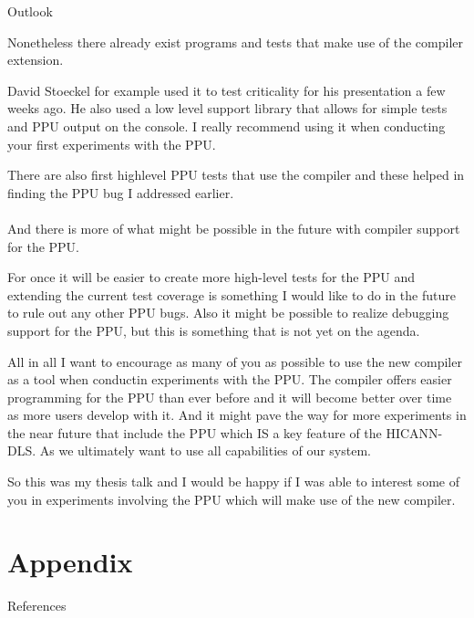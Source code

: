 \documentclass[10pt,aspectratio=169]{beamer}
\begin{document}
\begin{frame}[fragile]{Outlook}
{		Nonetheless there already exist programs and tests that make use of the compiler extension.

		David Stoeckel for example used it to test criticality for his presentation a few weeks ago.
		He also used a low level support library that allows for simple tests and PPU output on the console.
		I really recommend using it when conducting your first experiments with the PPU.

		There are also first highlevel PPU tests that use the compiler and these helped in finding the PPU bug I addressed earlier.
		\\
		\\
		And there is more of what might be possible in the future with compiler support for the PPU.

		For once it will be easier to create more high-level tests for the PPU and extending the current test coverage is something I would like to do in the future to rule out any other PPU bugs.
		Also it might be possible to realize debugging support for the PPU, but this is something that is not yet on the agenda.

		All in all I want to encourage as many of you as possible to use the new compiler as a tool when conductin experiments with the PPU.
		The compiler offers easier programming for the PPU than ever before and it will become better over time as more users develop with it.
		And it might pave the way for more experiments in the near future that include the PPU which IS a key feature of the HICANN-DLS.
		As we ultimately want to use all capabilities of our system.

		So this was my thesis talk and I would be happy if I was able to interest some of you in experiments involving the PPU which will make use of the new compiler.
}
\end{frame}

\appendix



\section{Appendix}
\nocite{PPU}
\nocite{microprocessor}
\nocite{UBHD-67548259}
\nocite{UBHD-66483012}
\nocite{nuxmanual}
\nocite{GCCint}

\begin{frame}[fragile]{References}
	\vspace*{3em}
	{\scriptsize
	\printbibliography}
\end{frame}
\end{document}
